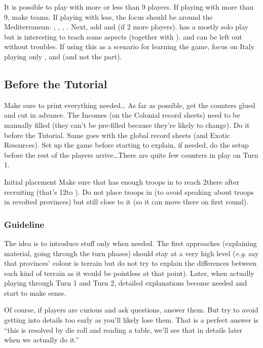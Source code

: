 It is possible to play with more or less than 9 players. If playing with more
than 9, make teams. If playing with less, the focus should be around the
Mediterranean: \TUR, \VEN, \FRA, \HIS. Next, add \POL and \RUS (if 2 more
players). \POR has a mostly solo play but is interesting to teach some \ROTW
aspects (together with \HIS). \ANG and \DAN can be left out without
troubles. If using this as a scenario for learning the game, focus on Italy
playing only \FRA, \VEN and \HIS (and not the \ROTW part).

\subsection{Before the Tutorial}
\aparag Make sure to print everything needed\ldots
\bparag As far as possible, get the counters glued and cut in advance.
\bparag The \TradeFLEET Incomes (on the Colonial record sheets) need to be
manually filled (they can't be pre-filled because they're likely to
change). Do it before the Tutorial.
\bparag Same goes with the global record sheets (\TradeFLEET and Exotic
Resources).
\bparag Set up the game before starting to explain, if needed, do the setup
before the rest of the players arrive\ldots There are quite few counters in
play on Turn 1.

\aparag Initial placement
\bparag Make sure that \FRA has enough troops in \provinceProvence to reach
2\ARMY\faceplus there after recruiting (that's 12\MP to \villeNaples).
\bparag Do not place \HIS troops in \provinceCatalogne (to avoid speaking
about troops in revolted provinces) but still close to it (so it can move
there on first round).

\subsubsection{Guideline}
The idea is to introduce stuff only when needed. The first
approaches (explaining material, going through the turn phases) should stay at
a very high level (\emph{e.g.} say that provinces' colour is terrain but do
not try to explain the differences between each kind of terrain as it would be
pointless at that point). Later, when actually playing through Turn 1 and Turn
2, detailed explanations become needed and start to make sense.

Of course, if players are curious and ask questions, answer them. But try to
avoid getting into details too early as you'll likely lose them. That is a
perfect answer is ``this is resolved by die roll and reading a table, we'll
see that in details later when we actually do it.''

